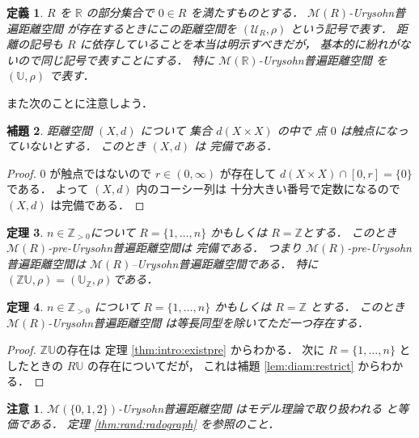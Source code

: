 \documentclass[leqno, 12pt]{jsarticle}
\newtheorem{thm}{定理}[section]
\newtheorem{lem}[thm]{補題}
\newtheorem{df}[thm]{定義}
\newtheorem*{rmk}{注意}
\newcommand{\zz}{\mathbb{Z}}
\newcommand{\rr}{\mathbb{R}}
\begin{document}
\begin{df}\label{df:intro:Urysohnspaces}
$R$
を
$\rr$
の部分集合で
$0\in R$
を満たすものとする．
$\mathscr{M}(R)$-Urysohn普遍距離空間
が存在するときにこの距離空間を
$(\mathscr{U}_{R}, \rho)$
という記号で表す．
距離の記号も
$R$
に依存していることを本当は明示すべきだが，
基本的に紛れがないので同じ記号で表すことにする．
特に
$\mathscr{M}(\rr)$-Urysohn普遍距離空間
を
$(\mathbb{U}, \rho)$
で表す．
\end{df}




また次のことに注意しよう．


\begin{lem}\label{lem:intro:completeness}
距離空間
$(X, d)$
について
集合
$d(X\times X)$
の中で
点
$0$
は触点になっていないとする．
このとき
$(X, d)$
は
完備である．
\end{lem}
\begin{proof}
$0$
が触点ではないので
$r\in (0, \infty)$
が存在して
$d(X\times X)\cap [0, r]=\{0\}$
である．
よって
$(X, d)$
内のコーシー列は
十分大きい番号で定数になるので
$(X, d)$
は完備である．
\end{proof}


\begin{thm}\label{thm:intro:integerUrysohn}
$n\in \zz_{>0}$について
$R=\{1, \dots, n\}$
かもしくは
$R=\zz$とする．
このとき
$\mathscr{M}(R)$-pre-Urysohn普遍距離空間は
完備である．
つまり
$\mathscr{M}(R)$-pre-Urysohn普遍距離空間は
$\mathscr{M}(R)$--Urysohn普遍距離空間である．
特に
$(\zz\mathbb{U}, \rho)=(\mathbb{U}_{\zz}, \rho)$である．
\end{thm}

\begin{thm}\label{thm:intro:existintegerUrysohn}
$n\in \zz_{>0}$
について
$R=\{1, \dots, n\}$
かもしくは
$R=\zz$
とする．
このとき
$\mathscr{M}(R)$-Urysohn普遍距離空間
は等長同型を除いてただ一つ存在する．
\end{thm}
\begin{proof}
$\zz\mathbb{U}$の存在は
定理 
\ref{thm:intro:existpre}
からわかる．
次に
$R=\{1, \dots, n\}$
としたときの
$R\mathbb{U}$
の存在についてだが，
これは補題 
\ref{lem:diam:restrict}
からわかる．
\end{proof}


\begin{rmk}
$\mathscr{M}(\{0, 1, 2\})$-Urysohn普遍距離空間
はモデル理論で取り扱われる
と等価である．
定理 
\ref{thm:rand:radograph}
を参照のこと．
\end{rmk}
\end{document}
